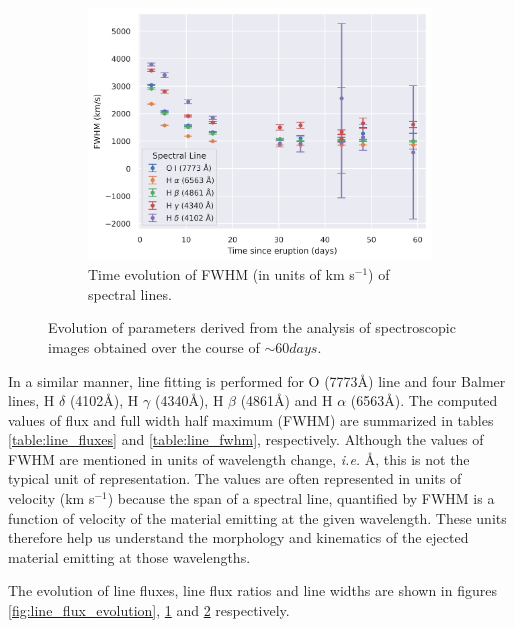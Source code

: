 \documentclass{tda}
\begin{document}
\begin{figure} [h!]
\begin{subfigure} {.49\textwidth}
			\label{fig:flux_ratio_evolution}
		\end{subfigure}
		\begin{subfigure} {.49\textwidth}
			\centering
			\includegraphics[width=\linewidth]{../codes/plots/line_width_evolution_kmps.png}
			\caption{Time evolution of FWHM (in units of km s\(^{-1}\)) of spectral lines.}
			\label{fig:line_width_evolution}
		\end{subfigure}
		\caption{Evolution of parameters derived from the analysis of spectroscopic images obtained over the course of \(\sim 60 days\).}
		\label{fig:time_evolution_parameters}
	\end{figure}

	In a similar manner, line fitting is performed for O \textsc{} (7773\r{A}) line and four Balmer lines, H \textsc{\(\delta\)} (4102\r{A}), H \textsc{\(\gamma\)} (4340\r{A}), H \textsc{\(\beta\)} (4861\r{A}) and H \textsc{\(\alpha\)} (6563\r{A}). The computed values of flux and full width half maximum (FWHM) are summarized in tables \ref{table:line_fluxes} and \ref{table:line_fwhm}, respectively. Although the values of FWHM are mentioned in units of wavelength change, \textit{i.e.} \r{A}, this is not the typical unit of representation. The values are often represented in units of velocity (km s\(^{-1}\)) because the span of a spectral line, quantified by FWHM is a function of velocity of the material emitting at the given wavelength. These units therefore help us understand the morphology and kinematics of the ejected material emitting at those wavelengths.

	The evolution of line fluxes, line flux ratios and line widths are shown in figures \ref{fig:line_flux_evolution}, \ref{fig:flux_ratio_evolution} and \ref{fig:line_width_evolution} respectively.
\end{document}
